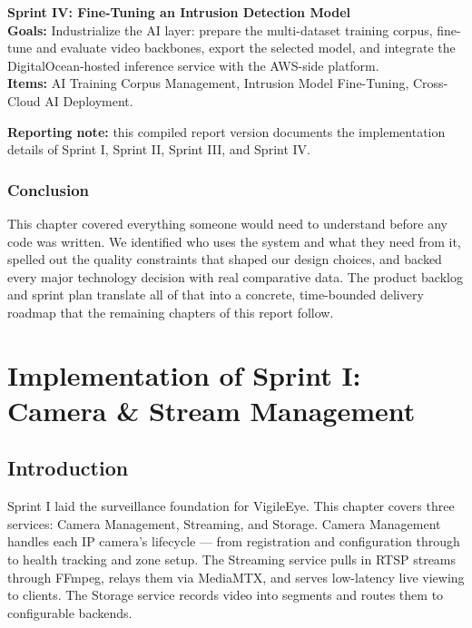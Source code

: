\documentclass[12pt,a4paper,oneside]{report}
\begin{document}
\textbf{Sprint IV: Fine-Tuning an Intrusion Detection Model}\\
\textbf{Goals:} Industrialize the AI layer: prepare the multi-dataset training corpus, fine-tune and evaluate video backbones, export the selected model, and integrate the DigitalOcean-hosted inference service with the AWS-side platform.\\
\textbf{Items:} AI Training Corpus Management, Intrusion Model Fine-Tuning, Cross-Cloud AI Deployment.

\hspace{0.8cm}\textbf{Reporting note:} this compiled report version documents the implementation details of Sprint I, Sprint II, Sprint III, and Sprint IV.



\subsection*{Conclusion}

\hspace{0.8cm}This chapter covered everything someone would need to understand before any code was written. We identified who uses the system and what they need from it, spelled out the quality constraints that shaped our design choices, and backed every major technology decision with real comparative data. The product backlog and sprint plan translate all of that into a concrete, time-bounded delivery roadmap that the remaining chapters of this report follow.


\chapter{Implementation of Sprint I: Camera \& Stream Management}
\label{chap:sprint1}

\section{Introduction}
\label{sec:s1_intro}

\hspace{0.8cm}Sprint I laid the surveillance foundation for VigileEye. This chapter covers three services: Camera Management, Streaming, and Storage. Camera Management handles each IP camera's lifecycle — from registration and configuration through to health tracking and zone setup. The Streaming service pulls in RTSP streams through FFmpeg, relays them via MediaMTX, and serves low-latency live viewing to clients. The Storage service records video into segments and routes them to configurable backends.
\end{document}
